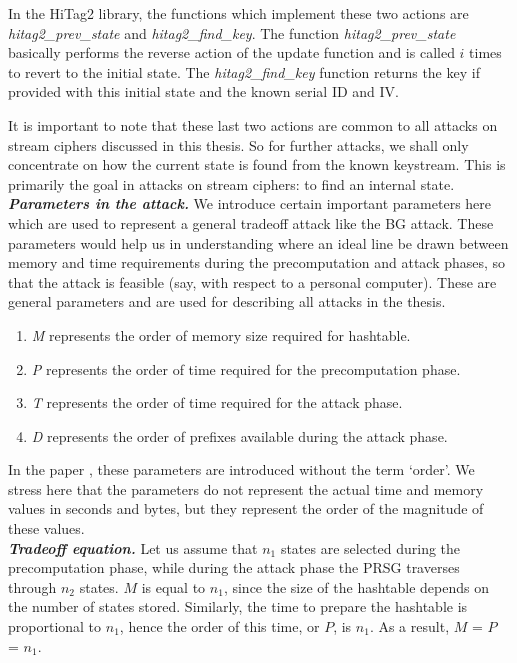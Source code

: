 In the HiTag2 library, the functions which implement these two actions are \textit{hitag2\_prev\_state} and \textit{hitag2\_find\_key}. The function \textit{hitag2\_prev\_state} basically performs the reverse action of the update function and is called $i$ times to revert to the initial state. The \textit{hitag2\_find\_key} function returns the key if provided with this initial state and the known serial ID and IV.

It is important to note that these last two actions are common to all attacks on stream ciphers discussed in this thesis. So for further attacks, we shall only concentrate on how the current state is found from the known keystream. This is primarily the goal in attacks on stream ciphers: to find an internal state.\\

\noindent \textit{\textbf{Parameters in the attack.}} We introduce certain important parameters here \cite{biryukov2000ctm} which are used to represent a general tradeoff attack like the BG attack. These parameters would help us in understanding where an ideal line be drawn between memory and time requirements during the precomputation and attack phases, so that the attack is feasible (say, with respect to a personal computer). These are general parameters and are used for describing all attacks in the thesis. 

\begin{enumerate}
\item \emph{M} represents the order of memory size required for hashtable.
\item \emph{P} represents the order of time required for the precomputation phase.
\item \emph{T} represents the order of time required for the attack phase.
\item \emph{D} represents the order of prefixes available during the attack phase.
\end{enumerate}

In the paper \cite{biryukov2000ctm}, these parameters are introduced without the term \mbox{`order'}. We stress here that the parameters do not represent the actual time and memory values in seconds and bytes, but they represent the order of the magnitude of these values.\\

\noindent \textit{\textbf{Tradeoff equation.}} Let us assume that $n_1$ states are selected during the precomputation phase, while during the attack phase the PRSG traverses through $n_2$ states. $M$ is equal to $n_1$, since the size of the hashtable depends on the number of states stored. Similarly, the time to prepare the hashtable is proportional to $n_1$, hence the order of this time, or $P$, is $n_1$. As a result, $M$ = $P$ = $n_1$.

